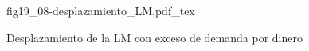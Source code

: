 \begin{figure}[h]
\centering
\def\svgwidth{0.9\textwidth}
{fig19_08-desplazamiento_LM.pdf_tex}
\caption{Desplazamiento de la LM con exceso de demanda por dinero}
\label{fig19_08-desplazamiento_LM}
\end{figure}